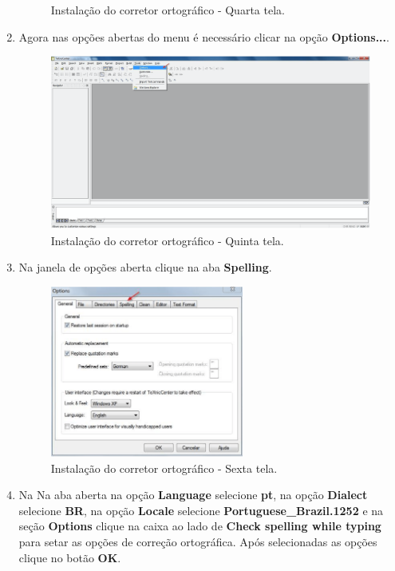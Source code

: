 \begin{enumerate}
\begin{figure}[H]
  \caption{Instalação do corretor ortográfico - Quarta tela.}
\end{figure}
\item Agora nas opções abertas do menu é necessário clicar na opção \textbf{Options...}.
\begin{figure}[H]
  \centering
  \includegraphics[width=1.0\textwidth]{./fig/vero06}
  \caption{Instalação do corretor ortográfico - Quinta tela.}
\end{figure}
\item Na janela de opções aberta clique na aba \textbf{Spelling}.
\begin{figure}[H]
  \centering
  \includegraphics[width=0.6\textwidth]{./fig/vero07}
  \caption{Instalação do corretor ortográfico - Sexta tela.}
\end{figure}
\item Na Na aba aberta na opção \textbf{Language} selecione \textbf{pt}, na opção \textbf{Dialect} selecione \textbf{BR}, na opção \textbf{Locale} selecione \textbf{Portuguese\_Brazil.1252} e na seção \textbf{Options} clique na caixa ao lado de \textbf{Check spelling while typing} para setar as opções de correção ortográfica. Após selecionadas as opções clique no botão \textbf{OK}.

\end{enumerate}
